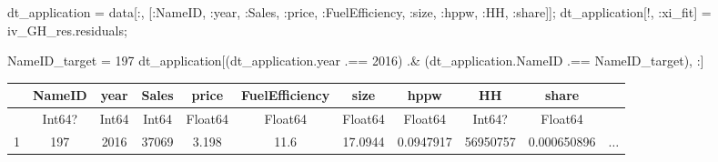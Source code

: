 \documentclass[
  letterpaper,
  DIV=11,
  numbers=noendperiod]{scrreprt}
\newenvironment{Shaded}{\begin{snugshade}}{\end{snugshade}}
\newcommand{\FloatTok}[1]{\textcolor[rgb]{0.68,0.00,0.00}{#1}}
\newcommand{\NormalTok}[1]{\textcolor[rgb]{0.00,0.23,0.31}{#1}}
\newcommand{\OperatorTok}[1]{\textcolor[rgb]{0.37,0.37,0.37}{#1}}
\begin{document}
\begin{Shaded}
\begin{Highlighting}[]
\NormalTok{dt\_application }\OperatorTok{=}\NormalTok{ data[}\OperatorTok{:}\NormalTok{, [}\OperatorTok{:}\NormalTok{NameID, }\OperatorTok{:}\NormalTok{year, }\OperatorTok{:}\NormalTok{Sales, }\OperatorTok{:}\NormalTok{price, }\OperatorTok{:}\NormalTok{FuelEfficiency, }\OperatorTok{:}\NormalTok{size, }\OperatorTok{:}\NormalTok{hppw, }\OperatorTok{:}\NormalTok{HH, }\OperatorTok{:}\NormalTok{share]];}
\NormalTok{dt\_application[!, }\OperatorTok{:}\NormalTok{xi\_fit] }\OperatorTok{=}\NormalTok{ iv\_GH\_res.residuals;}
\end{Highlighting}
\end{Shaded}

\begin{Shaded}
\begin{Highlighting}[]
\NormalTok{NameID\_target }\OperatorTok{=} \FloatTok{197}
\NormalTok{dt\_application[(dt\_application.year }\OperatorTok{.==} \FloatTok{2016}\NormalTok{) }\OperatorTok{.\&}\NormalTok{ (dt\_application.NameID }\OperatorTok{.==}\NormalTok{ NameID\_target), }\OperatorTok{:}\NormalTok{]}
\end{Highlighting}
\end{Shaded}

\begin{tabular}{r|cccccccccc}
    & NameID & year & Sales & price & FuelEfficiency & size & hppw & HH & share & \\
    \hline
    & Int64? & Int64 & Int64 & Float64 & Float64 & Float64 & Float64 & Int64? & Float64 & \\
    \hline
    1 & 197 & 2016 & 37069 & 3.198 & 11.6 & 17.0944 & 0.0947917 & 56950757 & 0.000650896 & $\dots$ \\
\end{tabular}
\end{document}
